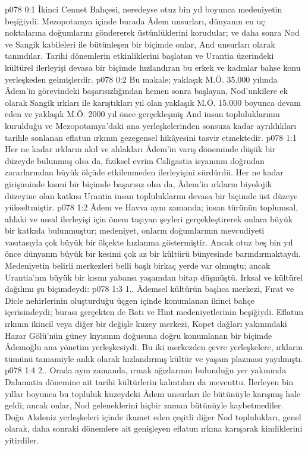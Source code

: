 \vs p078 0:1 İkinci Cennet Bahçesi, neredeyse otuz bin yıl boyunca medeniyetin beşiğiydi. Mezopotamya içinde burada Âdem unsurları, dünyanın en uç noktalarına doğumlarını göndererek üstünlüklerini korudular; ve daha sonra Nod ve Sangik kabileleri ile bütünleşen bir biçimde onlar, And unsurları olarak tanındılar. Tarihi dönemlerin etkinliklerini başlatan ve Urantia üzerindeki kültürel ilerleyişi devasa bir biçimde hızlandıran bu erkek ve kadınlar bahse konu yerleşkeden gelmişlerdir.
\vs p078 0:2 Bu makale; yaklaşık M.Ö. 35.000 yılında Âdem’in görevindeki başarısızlığından hemen sonra başlayan, Nod’unkilere ek olarak Sangik ırkları ile karıştıkları yıl olan yaklaşık M.Ö. 15.000 boyunca devam eden ve yaklaşık M.Ö. 2000 yıl önce gerçekleşmiş And insan topluluklarının kurulduğu ve Mezopotamya’daki ana yerleşkelerinden sonsuza kadar ayrıldıkları tarihle sonlanan eflatun ırkının gezegensel hikâyesini tasvir etmektedir.
\vs p078 1:1 Her ne kadar ırkların akıl ve ahlakları Âdem’in varış döneminde düşük bir düzeyde bulunmuş olsa da, fiziksel evrim Caligastia isyanının doğrudan zararlarından büyük ölçüde etkilenmeden ilerleyişini sürdürdü. Her ne kadar girişiminde kısmi bir biçimde başarısız olsa da, Âdem’in ırkların biyolojik düzeyine olan katkısı Urantia insan topluluklarını devasa bir biçimde üst düzeye yükseltmiştir.
\vs p078 1:2 Âdem ve Havva aynı zamanda; insan türünün toplumsal, ahlaki ve ussal ilerleyişi için önem taşıyan şeyleri gerçekleştirerek onlara büyük bir katkıda bulunmuştur; medeniyet, onların doğumlarının mevcudiyeti vasıtasıyla çok büyük bir ölçekte hızlanma göstermiştir. Ancak otuz beş bin yıl önce dünyanın büyük bir kesimi çok az bir kültürü bünyesinde barındırmaktaydı. Medeniyetin belirli merkezleri belli başlı birkaç yerde var olmuştu; ancak Urantia’nın büyük bir kısmı yabansı yaşamdan bitap düşmüştü. Irksal ve kültürel dağılımı şu biçimdeydi:
\vs p078 1:3 1.. Âdemsel kültürün başlıca merkezi, Fırat ve Dicle nehirlerinin oluşturduğu üçgen içinde konumlanan ikinci bahçe içerisindeydi; burası gerçekten de Batı ve Hint medeniyetlerinin beşiğiydi. Eflatun ırkının ikincil veya diğer bir değişle kuzey merkezi, Kopet dağları yakınındaki Hazar Gölü’nün güney kıyısının doğusuna doğru konumlanan bir biçimde Âdemoğlu ana yönetim yerleşkesiydi. Bu iki merkezden çevre yerleşkelere, ırkların tümünü tamamiyle anlık olarak hızlandırmış kültür ve yaşam plazması yayılmıştı.
\vs p078 1:4 2.\bibnobreakspace {}. Orada aynı zamanda, ırmak ağızlarının bulunduğu yer yakınında Dalamatia dönemine ait tarihi kültürlerin kalıntıları da mevcuttu. İlerleyen bin yıllar boyunca bu topluluk kuzeydeki Âdem unsurları ile bütünüyle karışmış hale geldi; ancak onlar, Nod geleneklerini hiçbir zaman bütünüyle kaybetmediler. Doğu Akdeniz yerleşkeleri içinde ikamet eden çeşitli diğer Nod toplulukları, genel olarak, daha sonraki dönemlere ait genişleyen eflatun ırkına karışarak kimliklerini yitirdiler.

